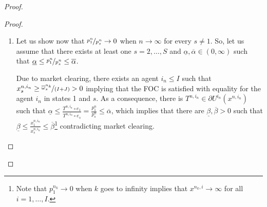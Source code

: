 \documentclass[pdftex]{article}
\numberwithin{equation}{section}
\theoremstyle{th}
\newtheorem{proof lemma}{{Proof Lemma}.}
\theoremstyle{definition}
\begin{document}
{\begin{proof}
\begin{proof}
\begin{enumerate}
Since $K^n\rightarrow\infty$, there exists at least one agent $\left(\overline{i}\leq{I}\right)$ and a subsequence $\left\{n_k\right\}_{k\in\mathbb{N}}$
such that $p^{n_k}\omega^{n_k,\overline{i}}$ is unbounded, and the
agent's consumption in the first state is also unbounded (which implies
that for $k$ large enough, $x_{1}^{n_k,\overline{i}}>0$) implying that the
FOC in state $1$ is satisfied with equality. Therefore,
for $k$ large enough and $\varepsilon\in(0,\hat{p}_{1})$, there is $T^{n_k,\overline{i}}\in\partial{U}^{\overline{i}}\left(x^{n_k,\overline{i}}\right)$\footnote{By $\partial U$ we mean the supperdifferential of the function $U$.}
such that $\frac{T^{n_k,\overline{i}}\circ{e_{1}}}{T^{n_k,\overline{i}}\circ{e_{s}}}\geq\frac{p_{1}^{n_k}}{p_{s}^{n_k}}\geq{\hat{p}_{1}-\varepsilon}>0$, which implies that $x_{s}^{n_k,\overline{i}}\rightarrow\infty$ as a consequence of A\ref{A2}, contradicting market clearing.



\item Let us show now that $\nicefrac{p_{1}^{n}}{p_s^n}\rightarrow0$ when $n\rightarrow\infty$ for every $s\neq1$. So, let us
assume that there exists at least one $s=2,\dots,S$ and $\underline{\alpha},\overline{\alpha}\in(0,\infty)$ such that $\underline{\alpha}\leq\nicefrac{p_{1}^{n}}{p_s^n}\leq\overline{\alpha}$.

Due to market clearing, there exists an agent $i_{n}\leq{I}$
such that $x_{s}^{n,i_{n}}\geq\nicefrac{\overline{\omega}_{s}^{n_k}}{(I+J)}>0$ implying that the FOC is satisfied with equality
for the agent $i_{n}$ in states 1 and $s$. As a consequence, there
is $T^{n,i_{n}}\in\partial{U}^{{i}_n}\left(x^{n,i_{n}}\right)$ such
that $\underline{\alpha}\leq\frac{T^{{n,i_{n}}}\circ{e_{1}}}{T^{{n,i_{n}}}\circ{e_{s}}}=\frac{p_{1}^{n}}{p_{s}^{n}}\leq\overline{\alpha}$, which implies that there are $\underline{\beta},\overline{\beta}>0$ such that $\underline{\beta}\leq\frac{x_{1}^{n,i_n}}{x_{s}^{n,i_n}}\leq\overline{\beta}$\footnote{Note that $p^{n_k}_1\rightarrow0$ when $k$ goes to infinity implies that $x^{n_k,i}\rightarrow\infty$ for all $i=1,\dots,I$.} contradicting market clearing.

\end{enumerate}
\end{proof}


\end{proof}}
\end{document}
